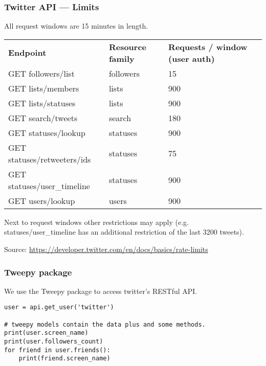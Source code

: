 \begin{frame}
    \frametitle{Twitter API --- Limits}

    All request windows are 15 minutes in length.

    \begin{table}[]
        \footnotesize
        \begin{tabular}{llll}
          \textbf{Endpoint}           & \textbf{Resource family} & \textbf{Requests / window (user auth)} \\
          GET followers/list          & followers                & 15                                     \\
          GET lists/members           & lists                    & 900                                    \\
          GET lists/statuses          & lists                    & 900                                    \\
          GET search/tweets           & search                   & 180                                    \\
          GET statuses/lookup         & statuses                 & 900                                    \\
          GET statuses/retweeters/ids & statuses                 & 75                                     \\
          GET statuses/user\_timeline & statuses                 & 900                                    \\
          GET users/lookup            & users                    & 900                                    \\
        \end{tabular}
    \end{table}

    Next to request windows other restrictions may
    apply (e.g. statuses/user\_timeline has an additional restriction of
    the last 3200 tweets).

    Source: \url{https://developer.twitter.com/en/docs/basics/rate-limits}
\end{frame}

\begin{frame}[fragile]
    \frametitle{Tweepy package}

    We use the Tweepy package to access twitter's RESTful API.

\begin{verbatim}
user = api.get_user('twitter')

# tweepy models contain the data plus and some methods.
print(user.screen_name)
print(user.followers_count)
for friend in user.friends():
    print(friend.screen_name)
\end{verbatim}

\end{frame}

